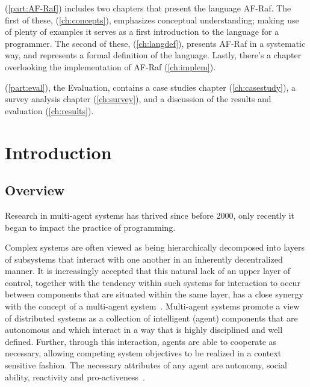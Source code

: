\documentclass[a4paper,12pt,oneside,fleqn]{book} %
\newcommand{\rg}[1]{\marginpar{\tiny\raggedright\textcolor{blue}{\bf rg:} #1}}
\renewcommand{\rg}{}
\begin{document}
(\autoref{part:AF-Raf}) includes two chapters that present the language
AF-Raf. The first of these, (\autoref{ch:concepts}), emphasizes conceptual
understanding; making use of
plenty of examples it serves as a first introduction to the language
for a programmer. The second of these, (\autoref{ch:langdef}), presents
AF-Raf in a systematic way, and represents a formal
definition of the language. Lastly, there's a chapter overlooking the
implementation of AF-Raf (\autoref{ch:implem}).

(\autoref{part:eval}), the Evaluation, contains a case studies chapter
(\autoref{ch:casestudy}), a survey analysis chapter
(\autoref{ch:survey}), and a discussion of the results and evaluation
(\autoref{ch:results}).

\mainmatter
\chapter{Introduction}\label{ch:intro} %

\section{Overview}

Research in multi-agent systems has thrived since before 2000, only
recently it began to impact the practice of programming.

Complex systems are often viewed as being hierarchically decomposed into
layers of subsystems that interact with one another in an inherently
decentralized manner. It is increasingly accepted that this natural lack of
an upper layer of control, together with the tendency within such systems
for interaction to occur between components that are situated within the
same layer, has a close synergy with the concept of a multi-agent
system~\cite{Jennings00agent-orientedsoftware}. Multi-agent systems promote
a view of distributed systems as a collection of intelligent (agent)
components that are autonomous and which interact in a way that is highly
disciplined and well defined. Further, through this interaction, agents are
able to cooperate as necessary, allowing competing system objectives to be
realized in a context sensitive fashion. The necessary attributes of any
agent are autonomy, social ability, reactivity and
pro-activeness~\cite{DBLP:journals/ker/WooldridgeJ95}.
\end{document}
